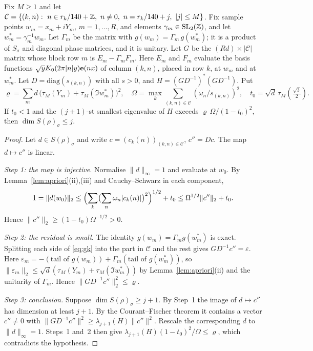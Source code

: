 \begin{proposition}\label{prop:hejhalcert}
Fix $M\ge1$ and let $\mathcal C=\{(k,n):\ n\in r_k/140+\mathbb{Z},\ n\neq0,\ n=r_k/140+j,\ |j|\le M\}$. Fix sample points $w_m=x_m+iY_m$, $m=1,\dots,R$, and elements $\gamma_m\in\mathrm{SL}_2(\mathbb{Z})$, and let
$w_m^*=\gamma_m^{-1}w_m$. Let $\Gamma_m$ be the matrix with $g(w_m)=\Gamma_m\,g(w_m^*)$; it is a product of $S_\sigma$ and diagonal phase matrices, and it is unitary. Let $G$ be the $(Rd)\times|\mathcal C|$
matrix whose block row $m$ is $E_m-\Gamma_mF_m$. Here $E_m$ and $F_m$ evaluate the basis functions $\sqrt yK_0(2\pi|n|y)\mathbf{e}(nx)$ of column $(k,n)$, placed in row $k$, at $w_m$ and at $w_m^*$.
Let $D=\mathrm{diag}(s_{(k,n)})$ with all $s>0$, and $H=(GD^{-1})^*(GD^{-1})$. Put
\[
\varrho=\sum_{m}d\,\bigl(\tau_M(Y_m)+\tau_M(\Im w_m^*)\bigr)^2,\quad \Omega=\max_k\sum_{(k,n)\in\mathcal C}(\omega_n/s_{(k,n)})^2,\quad t_0=\sqrt d\,\tau_M(\tfrac{\sqrt3}2).
\]
If $t_0<1$ and the $(j+1)$-st smallest eigenvalue of $H$ exceeds $\varrho\,\Omega/(1-t_0)^2$, then $\dim S(\rho)_\sigma\le j$.
\end{proposition}
\begin{proof}
Let $d\in S(\rho)_\sigma$ and write $c=(c_k(n))_{(k,n)\in\mathcal C}$, $c''=Dc$. The map $d\mapsto c''$ is linear.

\emph{Step 1: the map is injective.} Normalise $\|d\|_\infty=1$ and evaluate at $w_0$. By Lemma~\ref{lem:apriori}(ii),(iii) and Cauchy--Schwarz in each component,
\[
1=\|d(w_0)\|_2\le\Bigl(\sum_k\bigl(\sum_n\omega_n|c_k(n)|\bigr)^2\Bigr)^{1/2}+t_0\le\Omega^{1/2}\|c''\|_2+t_0 .
\]
Hence $\|c''\|_2\ge(1-t_0)\Omega^{-1/2}>0$.

\emph{Step 2: the residual is small.} The identity $g(w_m)=\Gamma_mg(w_m^*)$ is exact. Splitting each side of \eqref{eq:gk} into the part in $\mathcal C$ and the rest gives $GD^{-1}c''=\varepsilon$. Here
$\varepsilon_m=-(\text{tail of }g(w_m))+\Gamma_m(\text{tail of }g(w_m^*))$, so $\|\varepsilon_m\|_2\le\sqrt d(\tau_M(Y_m)+\tau_M(\Im w_m^*))$ by Lemma~\ref{lem:apriori}(ii) and the unitarity of $\Gamma_m$. Hence $\|GD^{-1}c''\|_2^2\le\varrho$.

\emph{Step 3: conclusion.} Suppose $\dim S(\rho)_\sigma\ge j+1$. By Step~1 the image of $d\mapsto c''$ has dimension at least $j+1$. By the Courant--Fischer theorem it contains a vector $c''\neq0$ with $\|GD^{-1}c''\|^2\ge\lambda_{j+1}(H)\|c''\|^2$. Rescale the corresponding $d$ to $\|d\|_\infty=1$. Steps~1 and~2 then give
$\lambda_{j+1}(H)(1-t_0)^2/\Omega\le\varrho$, which contradicts the hypothesis.
\end{proof}

